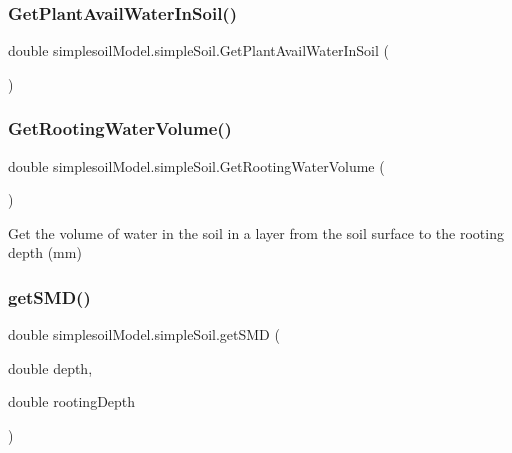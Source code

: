 \subsubsection{\texorpdfstring{GetPlantAvailWaterInSoil()}{GetPlantAvailWaterInSoil()}}
{\footnotesize\ttfamily double simplesoil\+Model.\+simple\+Soil.\+Get\+Plant\+Avail\+Water\+In\+Soil (\begin{DoxyParamCaption}{ }\end{DoxyParamCaption})\hspace{0.3cm}{\ttfamily [inline]}}

\mbox{\label{classsimplesoil_model_1_1simple_soil_a9784cacbb68950312021f3ff082c0fa5}} 
\subsubsection{\texorpdfstring{GetRootingWaterVolume()}{GetRootingWaterVolume()}}
{\footnotesize\ttfamily double simplesoil\+Model.\+simple\+Soil.\+Get\+Rooting\+Water\+Volume (\begin{DoxyParamCaption}{ }\end{DoxyParamCaption})\hspace{0.3cm}{\ttfamily [inline]}}



Get the volume of water in the soil in a layer from the soil surface to the rooting depth (mm) 

\mbox{\label{classsimplesoil_model_1_1simple_soil_a5ed67a8d25b44c463f586d3689296211}} 
\subsubsection{\texorpdfstring{getSMD()}{getSMD()}}
{\footnotesize\ttfamily double simplesoil\+Model.\+simple\+Soil.\+get\+S\+MD (\begin{DoxyParamCaption}\item[{double}]{depth,  }\item[{double}]{rooting\+Depth }\end{DoxyParamCaption})\hspace{0.3cm}{\ttfamily [inline]}}



